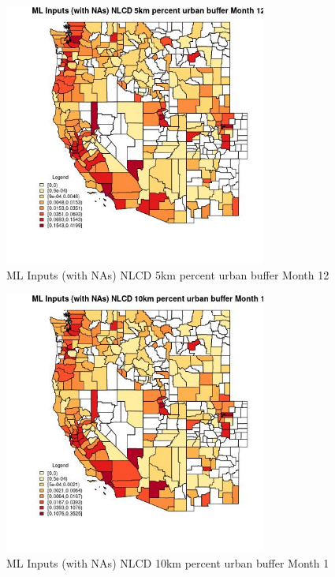 \begin{figure} 
\centering  
\includegraphics[width=0.77\textwidth]{Code_Outputs/Report_ML_input_PM25_Step4_part_f_de_duplicated_aveswNAs_CountyNLCD_5km_percent_urban_buffermedianMonth12.jpg} 
\caption{\label{fig:Report_ML_input_PM25_Step4_part_f_de_duplicated_aveswNAsCountyNLCD_5km_percent_urban_buffermedianMonth12}ML Inputs (with NAs) NLCD 5km percent urban buffer Month 12} 
\end{figure} 
 

\begin{figure} 
\centering  
\includegraphics[width=0.77\textwidth]{Code_Outputs/Report_ML_input_PM25_Step4_part_f_de_duplicated_aveswNAs_CountyNLCD_10km_percent_urban_buffermedianMonth1.jpg} 
\caption{\label{fig:Report_ML_input_PM25_Step4_part_f_de_duplicated_aveswNAsCountyNLCD_10km_percent_urban_buffermedianMonth1}ML Inputs (with NAs) NLCD 10km percent urban buffer Month 1} 
\end{figure} 
 

